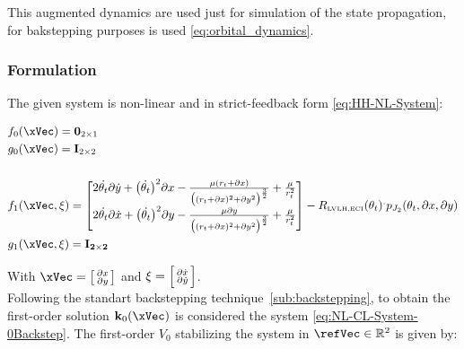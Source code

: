 This augmented dynamics are used just for simulation of the state propagation, for bakstepping purposes is used \ref{eq:orbital_dynamics}.

\subsubsection{ Formulation}
\label{subsubsec:Orbital_CLF-CBF_Experiment_Setup}


The given system is non-linear and in strict-feedback form \ref{eq:HH-NL-System}:

\begin{align}
  & f_0(\xVec) = \mathbf{0}_{2 \times 1}   \notag \\  &g_0(\xVec) = \mathbf{I}_{2 \times 2} \label{eq:orbital_0_dyn} \\ \notag \\
  & f_1(\xVec,\xi) = \begin{bmatrix}  2\dot{\theta_t}\partial\dot{y} + \bigl(\dot{\theta_t}\bigr)^2 \partial x - \frac{\mu(r_t + \partial x)}{\bigl((r_t+ \partial x)^2 + \partial y^2\bigr)^{\frac{3}{2}}} + \frac{\mu}{r_t^2}  \\ 2\dot{\theta_t}\partial\dot{x} + \bigl(\dot{\theta_t}\bigr)^2 \partial y - \frac{\mu \partial y}{\bigl((r_t + \partial x)^2 + \partial y^2\bigr)^{\frac{3}{2}}} + \frac{\mu}{r_t^2} \end{bmatrix} -  R_{\text{\tiny LVLH,ECI}}(\theta_t)^.p_{J_2}(\theta_t, \partial x, \partial y)   
  \notag \\ & g_1(\xVec, \xi) = \mathbf{I_{2 \times 2}}\label{eq:orbital_1_dyn}
\end{align}

With \(\xVec = \bigl[\begin{smallmatrix} \partial x \\ \partial y \end{smallmatrix} \bigr]\) and \(\xi = \Bigl[\begin{smallmatrix} \partial \dot{x} \\ \partial \dot{y} \end{smallmatrix} \Bigr]\). \\

Following the standart backstepping technique~\ref{sub:backstepping}, to obtain the first-order solution \(\mathbf{k}_0(\xVec)\) is considered the system \ref{eq:NL-CL-System-0Backstep}. The first-order  \(V_0\) stabilizing the system in \(\refVec \in \mathbb{R}^2\) is given by:



